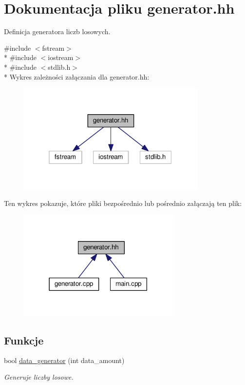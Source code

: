 \hypertarget{generator_8hh}{\section{Dokumentacja pliku generator.\-hh}
\label{generator_8hh}
}


Definicja generatora liczb losowych.  


{\ttfamily \#include $<$fstream$>$}\\*
{\ttfamily \#include $<$iostream$>$}\\*
{\ttfamily \#include $<$stdlib.\-h$>$}\\*
Wykres zależności załączania dla generator.\-hh\-:\nopagebreak
\begin{figure}[H]
\begin{center}
\leavevmode
\includegraphics[width=268pt]{generator_8hh__incl}
\end{center}
\end{figure}
Ten wykres pokazuje, które pliki bezpośrednio lub pośrednio załączają ten plik\-:\nopagebreak
\begin{figure}[H]
\begin{center}
\leavevmode
\includegraphics[width=230pt]{generator_8hh__dep__incl}
\end{center}
\end{figure}
\subsection*{Funkcje}
\begin{DoxyCompactItemize}
\item 
bool \hyperlink{generator_8hh_a6c501967035e575874570ef71d23f3af}{data\-\_\-generator} (int data\-\_\-amount)
\begin{DoxyCompactList}\small\item\em Generuje liczby losowe. \end{DoxyCompactList}\end{DoxyCompactItemize}


